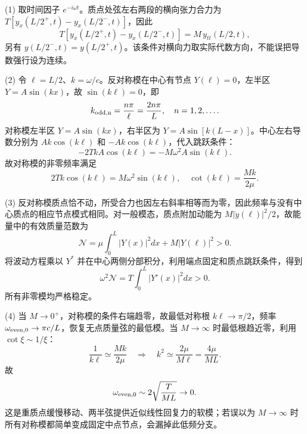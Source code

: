 (1) 取时间因子 \(e^{-i\omega t}\)。质点处弦左右两段的横向张力合力为 \(T[y_x(L/2^+,t)-y_x(L/2^-,t)]\)，因此
\[
T[y_x(L/2^+,t)-y_x(L/2^-,t)]
=M\,y_{tt}(L/2,t),
\]
另有 \(y(L/2^-,t)=y(L/2^+,t)\)。该条件对横向力取实际代数方向，不能误把导数强行设为连续。

(2) 令 \(\ell=L/2\)、\(k=\omega/c\)。反对称模在中心有节点 \(Y(\ell)=0\)，左半区 \(Y=A\sin(kx)\)，故 \(\sin(k\ell)=0\)，即
\[
k_{\rm odd,n}=\frac{n\pi}{\ell}=\frac{2n\pi}{L},\quad n=1,2,\ldots.
\]
对称模左半区 \(Y=A\sin(kx)\)，右半区为 \(Y=A\sin[k(L-x)]\)。中心左右导数分别为 \(Ak\cos(k\ell)\) 和 \(-Ak\cos(k\ell)\)，代入跳跃条件：
\[
-2TkA\cos(k\ell)=-M\omega^2A\sin(k\ell).
\]
故对称模的非零频率满足
\[
2Tk\cos(k\ell)=M\omega^2\sin(k\ell),\quad
\cot(k\ell)=\frac{Mk}{2\mu}.
\]

(3) 反对称模质点恰不动，所受合力也因左右斜率相等而为零，因此频率与没有中心质点的相应节点模式相同。对一般模态，质点附加动能为 \(M|\dot y(\ell)|^2/2\)，故能量中的有效质量范数为
\[
\mathscr N=\mu\int_0^L|Y(x)|^2dx+M|Y(\ell)|^2>0.
\]
将波动方程乘以 \(Y^*\) 并在中心两侧分部积分，利用端点固定和质点跳跃条件，得到
\[
\omega^2\mathscr N=T\int_0^L|Y'(x)|^2dx>0.
\]
所有非零模均严格稳定。

(4) 当 \(M\to0^+\)，对称模的条件右端趋零，故最低对称根 \(k\ell\to\pi/2\)，频率 \(\omega_{\rm even,0}\to\pi c/L\)，恢复无点质量弦的最低模。当 \(M\to\infty\) 时最低根趋近零，利用 \(\cot\xi\sim1/\xi\)：
\[
\frac1{k\ell}\simeq\frac{Mk}{2\mu}
\quad\Longrightarrow\quad k^2\simeq\frac{2\mu}{M\ell}=\frac{4\mu}{ML}.
\]
故
\[
\omega_{\rm even,0}\sim 2\sqrt{\frac{T}{ML}}\to0.
\]
这是重质点缓慢移动、两半弦提供近似线性回复力的软模；若误以为 \(M\to\infty\) 时所有对称模都简单变成固定中点节点，会漏掉此低频分支。
